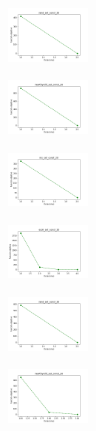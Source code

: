 \begin{figure}[H]
\begin{subfigure}
        \centering
        \includegraphics[width=0.234\textwidth]{img/copkm2/rand_set_const_20_277451237_cost.png}
    \end{subfigure}
    \hfill
    \begin{subfigure}
        \centering
        \includegraphics[width=0.234\textwidth]{img/copkm2/newthyroid_set_const_20_277451237_cost.png}
    \end{subfigure}
    \hfill
    \begin{subfigure}
        \centering
        \includegraphics[width=0.234\textwidth]{img/copkm2/iris_set_const_20_49258669_cost.png}
    \end{subfigure}
    \hfill
    \begin{subfigure}
        \centering
        \includegraphics[width=0.234\textwidth]{img/copkm2/ecoli_set_const_20_49258669_cost.png}
    \end{subfigure}
    \hfill
    \begin{subfigure}
        \centering
        \includegraphics[width=0.234\textwidth]{img/copkm2/rand_set_const_20_49258669_cost.png}
    \end{subfigure}
    \hfill
    \begin{subfigure}
        \centering
        \includegraphics[width=0.234\textwidth]{img/copkm2/newthyroid_set_const_20_49258669_cost.png}

\end{subfigure}
\end{figure}
